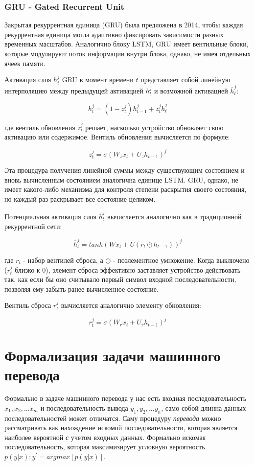 \documentclass[a4paper,russian]{article}
\begin{document}
	\clearpage
	
	\subsubsection{GRU - Gated Recurrent Unit}
	
	Закрытая рекуррентная единица (GRU) была предложена в 2014, чтобы каждая рекуррентная единица
	могла адаптивно фиксировать зависимости разных временных масштабов. Аналогично блоку LSTM, GRU имеет
	вентильные блоки, которые модулируют поток информации внутри блока, однако, не имея отдельных
	ячеек памяти.
	
	Активация слоя $h^{j}_{t}$ GRU в момент времени $t$ представляет собой линейную интерполяцию между предыдущей активацией $h^{j}_{t}$ и возможной активацией $\overline{h}^{j}_{t}$:
	
	$$ h^{j}_{t} = (1 - z^{j}_{t})h^{j}_{t - 1} + z^{j}_{t} \overline{h}^{j}_{t} $$
	
	где вентиль обновления $z^{j}_{t}$ решает, насколько устройство обновляет свою активацию или содержимое. Вентиль обновления вычисляется по формуле:
	
 	$$ z^{j}_{t} = \sigma(W_z x_t + U_z h_{t - 1})^j $$

	Эта процедура получения линейной суммы между существующим состоянием и вновь вычисленным состоянием аналогична единице LSTM. GRU, однако, не имеет какого-либо механизма для контроля степени раскрытия своего состояния, но каждый раз раскрывает все состояние целиком.
	
	Потенциальная активация слоя $\overline{h}^{j}_{t}$ вычисляется аналогично как в традиционной рекуррентной сети:
	
	$$ \overline{h}^{j}_{t} = tanh(W x_t + U(r_t \odot h_{t - 1}))^j $$
	
	где $r_t$ - набор вентилей сброса, а $\odot$ - поэлементное умножение. Когда выключено ($r^{j}_{t}$ близко к 0), элемент сброса эффективно заставляет устройство действовать так, как если бы оно считывало первый символ входной последовательности, позволяя ему забыть ранее вычисленное состояние.
	
	Вентиль сброса $r^{j}_{t}$ вычисляется аналогично элементу обновления:
	
	$$ r^{j}_{t} = \sigma(W_r x_t + U_r h_{t - 1})^j $$
	
 	\clearpage
	
	\section{Формализация задачи машинного перевода}
	Формально в задаче машинного перевода у нас есть входная последовательность $x_{1}, x_{2}, ... x_{m}$ и последовательность вывода $y_{1}, y_{2}, ... y_{n}$, само собой длинна данных последовательностей может отличатся. Саму процедуру \textit{перевода} можно рассматривать как нахождение искомой последовательности, которая является наиболее вероятной с учетом входных данных. Формально искомая последовательность, которая максимизирует условную вероятность $p(y|x): y^{'} = argmax[p(y|x)]$.
	
\end{document}
